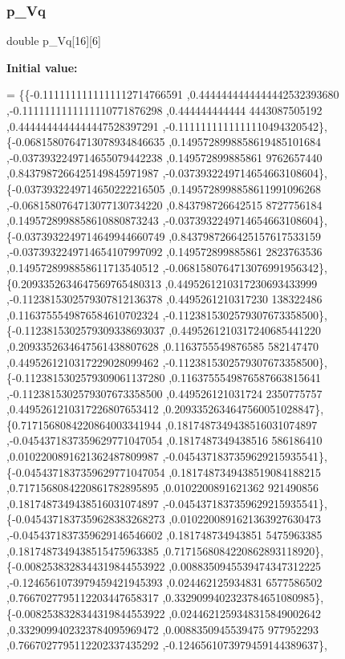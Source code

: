 \subsubsection{\texorpdfstring{p\+\_\+\+Vq}{p\_Vq}}
{\footnotesize\ttfamily double p\+\_\+\+Vq\mbox{[}16\mbox{]}\mbox{[}6\mbox{]}}

{\bfseries Initial value\+:}
\begin{DoxyCode}
= \{\{-0.1111111111111112714766591 ,0.4444444444444442532393680 ,-0.1111111111111110771876298 ,0.444444444444
      4443087505192 ,0.4444444444444447528397291 ,-0.1111111111111110494320542\},
\{-0.0681580764713078934846635 ,0.1495728998858619485101684 ,-0.0373932249714655079442238 ,0.149572899885861
      9762657440 ,0.8437987266425149845971987 ,-0.0373932249714654663108604\},
\{-0.0373932249714650222216505 ,0.1495728998858611991096268 ,-0.0681580764713077130734220 ,0.843798726642515
      8727756184 ,0.1495728998858610880873243 ,-0.0373932249714654663108604\},
\{-0.0373932249714649944660749 ,0.8437987266425157617533159 ,-0.0373932249714654107997092 ,0.149572899885861
      2823763536 ,0.1495728998858611713540512 ,-0.0681580764713076991956342\},
\{0.2093352634647569765480313 ,0.4495261210317230693433999 ,-0.1123815302579307812136378 ,0.4495261210317230
      138322486 ,0.1163755549876584610702324 ,-0.1123815302579307673358500\},
\{-0.1123815302579309338693037 ,0.4495261210317240685441220 ,0.2093352634647561438807628 ,0.1163755549876585
      582147470 ,0.4495261210317229028099462 ,-0.1123815302579307673358500\},
\{-0.1123815302579309061137280 ,0.1163755549876587663815641 ,-0.1123815302579307673358500 ,0.449526121031724
      2350775757 ,0.4495261210317226807653412 ,0.2093352634647560051028847\},
\{0.7171568084220864003341944 ,0.1817487349438516031074897 ,-0.0454371837359629771047054 ,0.1817487349438516
      586186410 ,0.0102200891621362487809987 ,-0.0454371837359629215935541\},
\{-0.0454371837359629771047054 ,0.1817487349438519084188215 ,0.7171568084220861782895895 ,0.0102200891621362
      921490856 ,0.1817487349438516031074897 ,-0.0454371837359629215935541\},
\{-0.0454371837359628383268273 ,0.0102200891621363927630473 ,-0.0454371837359629146546602 ,0.181748734943851
      5475963385 ,0.1817487349438515475963385 ,0.7171568084220862893118920\},
\{-0.0082538328344319844553922 ,0.0088350945539474347312225 ,-0.1246561073979459421945393 ,0.024462125934831
      6577586502 ,0.7667027795112203447658317 ,0.3329099402323784651080985\},
\{-0.0082538328344319844553922 ,0.0244621259348315849002642 ,0.3329099402323784095969472 ,0.0088350945539475
      977952293 ,0.7667027795112202337435292 ,-0.1246561073979459144389637\},

\end{DoxyCode}
